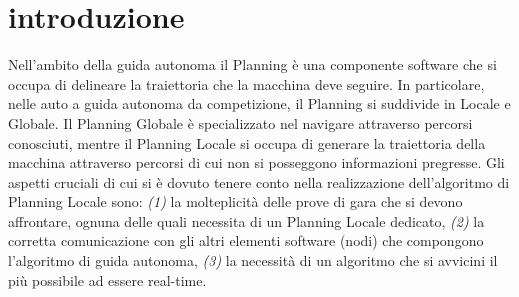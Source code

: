 \chapter{introduzione}
Nell'ambito della guida autonoma il Planning è una componente software che si occupa di delineare la traiettoria che la macchina deve seguire. In particolare, nelle auto a guida autonoma da competizione, il Planning si suddivide in Locale e Globale. Il Planning Globale è specializzato nel navigare attraverso percorsi conosciuti, mentre il Planning Locale si occupa di generare la traiettoria della macchina attraverso percorsi di cui non si posseggono informazioni pregresse. Gli aspetti cruciali di cui si è dovuto tenere conto nella realizzazione dell'algoritmo di Planning Locale sono: \textit{(1)} la molteplicità delle prove di gara che si devono affrontare, ognuna delle quali necessita di un Planning Locale dedicato, \textit{(2)} la corretta comunicazione con gli altri elementi software (nodi) che compongono l'algoritmo di guida autonoma, \textit{(3)} la necessità di un algoritmo che si avvicini il più possibile ad essere real-time.
